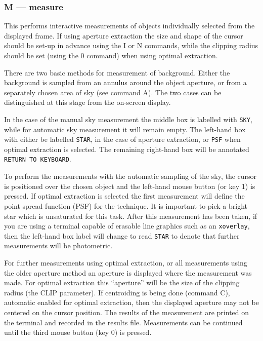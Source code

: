 \documentclass[twoside,11pt]{article}
\renewcommand{\_}{\texttt{\symbol{95}}}
\begin{document}
\subsubsection{M --- measure}

This performs interactive measurements of objects individually selected
from the displayed frame. If using aperture extraction the size and shape
of the cursor should be set-up in advance using the I or N commands, while
the clipping radius should be set (using the 0 command) when using optimal
extraction.

There are two basic methods for measurement of background. Either the
background is sampled from an annulus around the object aperture, or
from a separately chosen area of sky (see command A). The two cases can be
distinguished at this stage from the on-screen display.

In the case of the manual sky measurement the middle box is
labelled with \texttt{SKY}, while for automatic sky measurement it
will remain empty. The left-hand box with either be labelled \texttt{STAR},
in the case of  aperture extraction, or \texttt{PSF} when optimal extraction is
selected. The remaining right-hand box will be annotated \texttt{RETURN~TO~KEYBOARD}.

To perform the measurements with the automatic sampling of the sky,
the cursor is positioned over the chosen object and the left-hand
mouse button (or key 1) is pressed. If optimal extraction is selected
the first measurement will define the point spread function (PSF) for
the technique. It is important to pick a bright star which is unsaturated
for this task. After this measurement has been taken, if you are using a terminal capable of erasable line graphics such as an \texttt{xoverlay},
then the left-hand box  label will change to read \texttt{STAR} to denote that
further measurements will be photometric.

For further measurements using optimal extraction, or all measurements
using the older aperture method an aperture is displayed where the measurement was made. For optimal extraction this ``aperture'' will be the size of
the clipping radius (the CLIP parameter). If centroiding is being done
(command C), automatic enabled for optimal extraction, then the displayed aperture may not be centered on the cursor position. The results of the measurement are printed on the terminal and recorded in the results file. Measurements can be continued until the third mouse button (key 0) is pressed.
\end{document}
